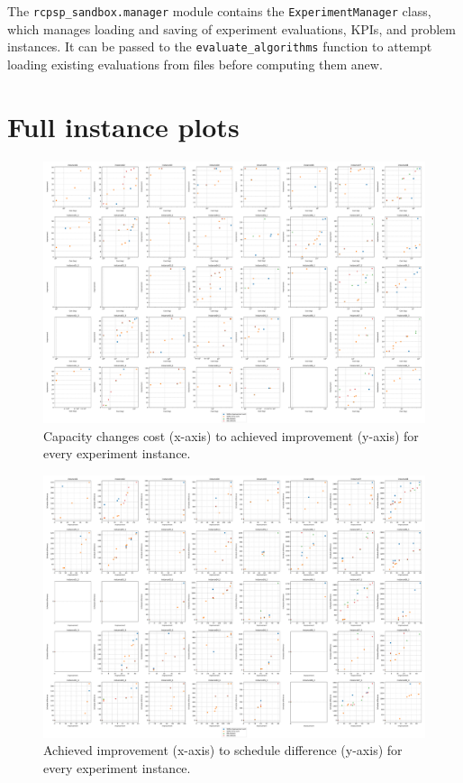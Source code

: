 The \texttt{rcpsp\_sandbox.manager} module contains the \texttt{ExperimentManager} class,
which manages loading and saving of experiment evaluations, KPIs, and problem instances.
It can be passed to the \texttt{evaluate\_algorithms} function
to attempt loading existing evaluations from files before computing them anew.

\section{Full instance plots} \label{sec:attachments/full-instance-plots}

\begin{figure}[p]
    \centering
    \includegraphics[angle=270, width=\textwidth]{img/exp_cost_improv.pdf}
    \caption{
        Capacity changes cost (x-axis) to achieved 
        improvement (y-axis) for every experiment instance.
        }
    \label{fig:exp-full/cost-improv}
\end{figure}

\begin{figure}[p]
    \centering
    \includegraphics[angle=270,width=\textwidth]{img/exp_improv_diff.pdf}
    \caption{
        Achieved improvement (x-axis) to schedule
        difference (y-axis) for every experiment instance.
        }
    \label{fig:exp-full/improv-diff}
\end{figure}

